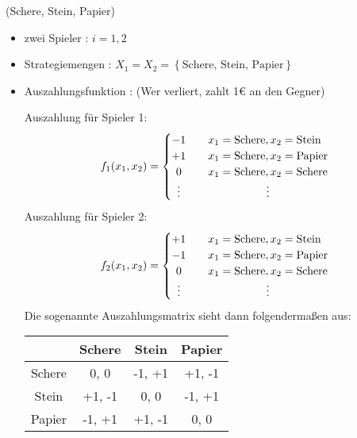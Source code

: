 \begin{beispiel}
	(Schere, Stein, Papier)
	\begin{itemize}
		\item zwei Spieler : $i=1,2$
		\item Strategiemengen : $X_1 = X_2 = \left\{\text{Schere, Stein, Papier}\right\}$
		\item Auszahlungsfunktion : (Wer verliert, zahlt 1€ an den Gegner)

			Auszahlung für Spieler 1:
			\[
				f_1(x_1,x_2) = \begin{cases}
					\hfil -1 &\quad x_1 = \text{Schere}, x_2 =\text{Stein} \\
					\hfil +1 &\quad x_1 = \text{Schere}, x_2 = \text{Papier} \\
					\hfil 0 &\quad x_1 = \text{Schere}, x_2 = \text{Schere} \\
					\hfil \vdots &\quad \hfil \vdots
				\end{cases}
			\] 
			Auszahlung für Spieler 2:
			\[
				f_2(x_1,x_2) = \begin{cases}
					\hfil +1 &\quad x_1 = \text{Schere}, x_2 =\text{Stein} \\
					\hfil -1 &\quad x_1 = \text{Schere}, x_2 = \text{Papier} \\
					\hfil 0 &\quad x_1 = \text{Schere}, x_2 = \text{Schere} \\
					\hfil \vdots &\quad \hfil \vdots
				\end{cases}
			\]
			Die sogenannte Auszahlungsmatrix sieht dann folgendermaßen aus:
			\begin{center}
				\begin{tabular}{c|c|c|c}
					&Schere &Stein & Papier \\ \hline
					Schere & 0, 0 & -1, +1 & +1, -1 \\ \hline
					Stein & +1, -1 & 0, 0 & -1, +1 \\ \hline
					Papier & -1, +1 & +1, -1 & 0, 0
				\end{tabular}
			\end{center}
	\end{itemize}
\end{beispiel}

